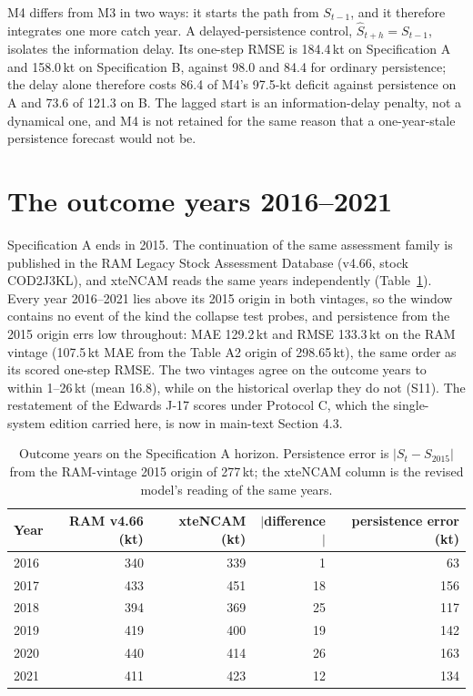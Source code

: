 \documentclass[preprint,11pt,authoryear]{elsarticle}
\theoremstyle{remark}
\begin{document}
M4 differs from M3 in two ways: it starts the path from $S_{t-1}$, and it therefore integrates one more catch year. A delayed-persistence control, $\hat S_{t+h} = S_{t-1}$, isolates the information delay. Its one-step RMSE is 184.4\,kt on Specification A and 158.0\,kt on Specification B, against 98.0 and 84.4 for ordinary persistence; the delay alone therefore costs 86.4 of M4's 97.5-kt deficit against persistence on A and 73.6 of 121.3 on B. The lagged start is an information-delay penalty, not a dynamical one, and M4 is not retained for the same reason that a one-year-stale persistence forecast would not be.

\FloatBarrier
\section{The outcome years 2016--2021}\label{si:outcome}

Specification A ends in 2015. The continuation of the same assessment family is published in the RAM Legacy Stock Assessment Database (v4.66, stock COD2J3KL), and xteNCAM reads the same years independently (Table~\ref{tab:si_outcome}). Every year 2016--2021 lies above its 2015 origin in both vintages, so the window contains no event of the kind the collapse test probes, and persistence from the 2015 origin errs low throughout: MAE 129.2\,kt and RMSE 133.3\,kt on the RAM vintage (107.5\,kt MAE from the Table A2 origin of 298.65\,kt), the same order as its scored one-step RMSE. The two vintages agree on the outcome years to within 1--26\,kt (mean 16.8), while on the historical overlap they do not (S11). The restatement of the Edwards J-17 scores under Protocol C, which the single-system edition carried here, is now in main-text Section 4.3.

\begin{table}[!htb]
\centering\footnotesize\setlength{\tabcolsep}{3.5pt}
\caption{Outcome years on the Specification A horizon. Persistence error is $|S_t - S_{2015}|$ from the RAM-vintage 2015 origin of 277\,kt; the xteNCAM column is the revised model's reading of the same years.}
\label{tab:si_outcome}
\begin{tabular}{@{}lrrrr@{}}
\toprule
Year & RAM v4.66 (kt) & xteNCAM (kt) & $|$difference$|$ & persistence error (kt) \\
\midrule
2016 & 340 & 339 & 1 & 63 \\
2017 & 433 & 451 & 18 & 156 \\
2018 & 394 & 369 & 25 & 117 \\
2019 & 419 & 400 & 19 & 142 \\
2020 & 440 & 414 & 26 & 163 \\
2021 & 411 & 423 & 12 & 134 \\
\bottomrule
\end{tabular}
\end{table}
\FloatBarrier
\end{document}
